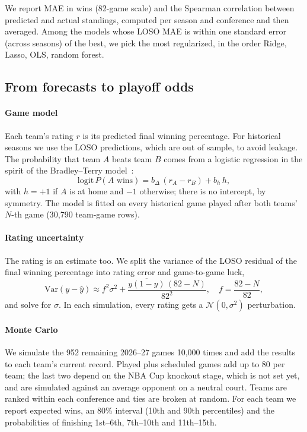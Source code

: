 \documentclass[conference]{IEEEtran}
\begin{document}
We report MAE in wins (82-game scale) and the Spearman correlation between predicted and actual standings, computed per season and conference and then averaged. Among the models whose LOSO MAE is within one standard error (across seasons) of the best, we pick the most regularized, in the order Ridge, Lasso, OLS, random forest.

\subsection{From forecasts to playoff odds}
\paragraph{Game model} Each team's rating $r$ is its predicted final winning percentage. For historical seasons we use the LOSO predictions, which are out of sample, to avoid leakage. The probability that team $A$ beats team $B$ comes from a logistic regression in the spirit of the Bradley--Terry model~\cite{bradley1952}:
\begin{equation}
\mathrm{logit}\,P(A \text{ wins}) = b_{\Delta}\,(r_A - r_B) + b_{h}\,h,
\label{eq:logit}
\end{equation}
with $h=+1$ if $A$ is at home and $-1$ otherwise; there is no intercept, by symmetry. The model is fitted on every historical game played after both teams' $N$-th game (30,790 team-game rows).

\paragraph{Rating uncertainty} The rating is an estimate too. We split the variance of the LOSO residual of the final winning percentage into rating error and game-to-game luck,
\begin{equation}
\mathrm{Var}(y-\hat y) \approx f^2\sigma^2 + \frac{\overline{y(1-y)}\,(82-N)}{82^2}, \quad f=\frac{82-N}{82},
\label{eq:sigma}
\end{equation}
and solve for $\sigma$. In each simulation, every rating gets a $\mathcal{N}(0,\sigma^2)$ perturbation.

\paragraph{Monte Carlo} We simulate the 952 remaining 2026--27 games 10,000 times and add the results to each team's current record. Played plus scheduled games add up to 80 per team; the last two depend on the NBA Cup knockout stage, which is not set yet, and are simulated against an average opponent on a neutral court. Teams are ranked within each conference and ties are broken at random. For each team we report expected wins, an 80\% interval (10th and 90th percentiles) and the probabilities of finishing 1st--6th, 7th--10th and 11th--15th.
\end{document}
